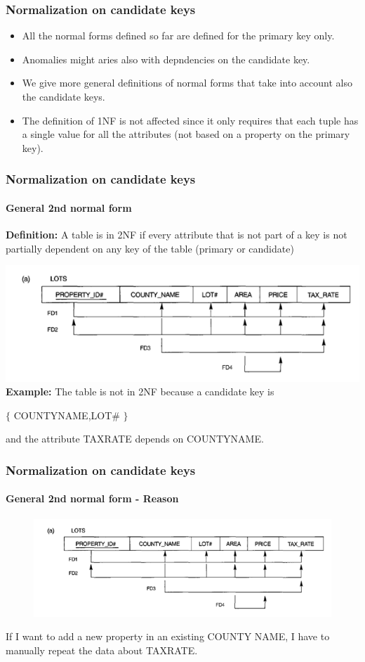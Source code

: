 \documentclass{beamer}
\newcommand{\valseq}[1]{$\lbrace$ #1 $\rbrace$}
\begin{document}

\begin{frame}
	\frametitle{Normalization on candidate keys}
	
	\begin{itemize}
		\item All the normal forms defined so far are defined for the primary key only.
		\item Anomalies might aries also with depndencies on the candidate key.
		\item We give more general definitions of normal forms that take into account also the candidate keys.
		\item The definition of 1NF is not affected since it only requires that each tuple has a single value for all the attributes (not based on a property on the primary key).		
	\end{itemize}
\end{frame}

\begin{frame}
	\frametitle{Normalization on candidate keys}
	\framesubtitle{General 2nd normal form}
	
	\textbf{Definition:}
	A table is in 2NF if every attribute that is not part of a key is not partially dependent on any key of the table (primary or candidate)
	
	\includegraphics[scale=0.4]{img/normalization/norm12}
\pause	
	\textbf{Example:}
	The table is not in 2NF because a candidate key is
	
	\valseq{COUNTY\textunderscore NAME,LOT\#} 
	
	and the attribute TAX\textunderscore RATE depends on COUNTY\textunderscore NAME.
\end{frame}

\begin{frame}
	\frametitle{Normalization on candidate keys}
	\framesubtitle{General 2nd normal form - Reason}
	
	\begin{figure}
		\includegraphics[scale=0.4]{img/normalization/norm12}
	\end{figure}
	
\pause
	If I want to add a new property in an existing COUNTY \textunderscore NAME, I have to manually repeat the data about TAX\textunderscore RATE.
\end{frame}
\end{document}
